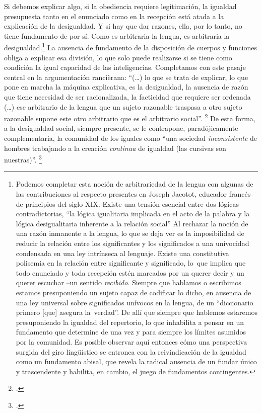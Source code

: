 Si debemos explicar algo, si la obediencia requiere legitimación, la igualdad presupuesta tanto en el enunciado como en la recepción está atada a la explicación de la desigualdad. Y si hay que dar razones, ella, por lo tanto, no tiene fundamento de por sí. Como es arbitraria la lengua, es arbitraria la desigualdad.\footnote{Podemos completar esta noción de arbitrariedad de la lengua con algunas de las contribuciones al respecto presentes en Joseph Jacotot, educador francés de principios del siglo XIX. Existe una tensión esencial entre dos lógicas contradictorias, \enquote{la lógica igualitaria implicada en el acto de la palabra y la lógica desigualitaria inherente a la relación social} Al rechazar la noción de una razón inmanente a la lengua, lo que se deja ver es la imposibilidad de reducir la relación entre los significantes y los significados a una univocidad condensada en una ley intrínseca al lenguaje. Existe una constitutiva polisemia en la relación entre significante y significado, lo~que implica que todo enunciado y toda recepción estén marcados por un querer decir  y un querer escuchar --un sentido \emph{recibido}. Siempre que hablamos o escribimos estamos presuponiendo un sujeto capaz de codificar lo dicho, en ausencia de una ley universal sobre significados unívocos en la lengua, de un \enquote{diccionario primero {[}que{]} asegura la~verdad}. De allí que siempre que hablemos estaremos presuponiendo la igualdad del repertorio, lo que inhabilita a pensar en un fundamento que determine de una vez y para siempre los límites asumidos por la comunidad. Es posible observar aquí entonces cómo una perspectiva surgida del giro lingüístico se entronca con la reivindicación de la igualdad como un fundamento abisal, que revela la radical ausencia de un fundar único y trascendente y habilita, en cambio, el juego de fundamentos contingentes.} La ausencia de fundamento de la disposición de cuerpos y funciones obliga a explicar esa división, lo que solo puede realizarse si se tiene como condición la igual capacidad de las inteligencias. Completamos con este pasaje central en la argumentación rancièrana: \enquote{(\ldots)  lo que se trata de explicar, lo que pone en marcha la máquina explicativa, es la desigualdad, la ausencia de razón que tiene necesidad de ser racionalizada, la facticidad que requiere ser ordenada (\ldots) ese arbitrario de la lengua que un sujeto razonable traspasa a otro sujeto razonable supone este otro arbitrario que es el arbitrario social}. \footcite[Versión digital][65]{@7065-RANCIERE2007} De esta forma, a la desigualdad social, siempre presente, se le contrapone, paradójicamente complementaria, la comunidad de los iguales como \enquote{una sociedad \emph{inconsistente} de hombres trabajando a la creación \emph{continua} de igualdad (las cursivas son nuestras)}. \footcite[Versión digital][66]{@7065-RANCIERE2007}


